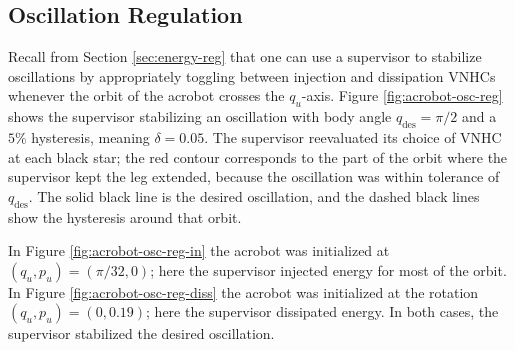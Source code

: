 \documentclass[journal,twoside,web, onecolumn, draftcls]{ieeecolor}
\begin{document}
\subsection{Oscillation Regulation}

Recall from Section \ref{sec:energy-reg} that one can use a supervisor to stabilize
oscillations by appropriately toggling between injection and dissipation VNHCs
whenever the orbit of the acrobot crosses the \(q_u\)-axis.
Figure \ref{fig:acrobot-osc-reg} shows the supervisor stabilizing an
oscillation with body angle \(q_\text{des} = \pi/2\) and a 
\(5\%\) hysteresis, meaning \(\delta = 0.05\).
The supervisor reevaluated its choice of VNHC at each black star;  
the red contour corresponds to the part of the orbit where the supervisor kept
the leg extended, because the oscillation was within tolerance of
\(q_\text{des}\).
The solid black line is the desired oscillation, and the dashed black
lines show the hysteresis around that orbit.

In Figure \ref{fig:acrobot-osc-reg-in} the acrobot was initialized at 
\((q_u,p_u) = (\pi/32,0)\); here the supervisor injected energy for most of the
orbit.
In Figure \ref{fig:acrobot-osc-reg-diss} the acrobot was initialized at the rotation
\((q_u,p_u) = (0,0.19)\); here the supervisor dissipated energy. 
In both cases, the supervisor stabilized the desired oscillation.
\end{document}
